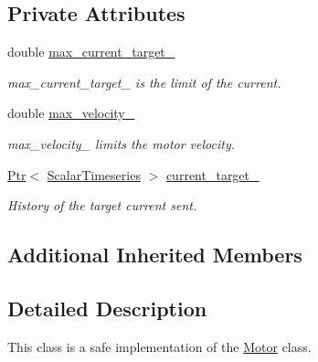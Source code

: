 \subsection*{Private Attributes}
\begin{DoxyCompactItemize}
\item 
double \hyperlink{classblmc__drivers_1_1SafeMotor_ae58230855ac502d9c702304d785eb833}{max\+\_\+current\+\_\+target\+\_\+}\hypertarget{classblmc__drivers_1_1SafeMotor_ae58230855ac502d9c702304d785eb833}{}\label{classblmc__drivers_1_1SafeMotor_ae58230855ac502d9c702304d785eb833}

\begin{DoxyCompactList}\small\item\em max\+\_\+current\+\_\+target\+\_\+ is the limit of the current. \end{DoxyCompactList}\item 
double \hyperlink{classblmc__drivers_1_1SafeMotor_a1885b2a1c298765cae0a7ccda75d5f3f}{max\+\_\+velocity\+\_\+}\hypertarget{classblmc__drivers_1_1SafeMotor_a1885b2a1c298765cae0a7ccda75d5f3f}{}\label{classblmc__drivers_1_1SafeMotor_a1885b2a1c298765cae0a7ccda75d5f3f}

\begin{DoxyCompactList}\small\item\em max\+\_\+velocity\+\_\+ limits the motor velocity. \end{DoxyCompactList}\item 
\hyperlink{classblmc__drivers_1_1MotorInterface_ae31f230b9da3674a05543023c90b124c}{Ptr}$<$ \hyperlink{classblmc__drivers_1_1MotorInterface_a49b8fc916b9f9debbd7b0988463db5cd}{Scalar\+Timeseries} $>$ \hyperlink{classblmc__drivers_1_1SafeMotor_af79e6910868177f18a498ea83b350e3f}{current\+\_\+target\+\_\+}\hypertarget{classblmc__drivers_1_1SafeMotor_af79e6910868177f18a498ea83b350e3f}{}\label{classblmc__drivers_1_1SafeMotor_af79e6910868177f18a498ea83b350e3f}

\begin{DoxyCompactList}\small\item\em History of the target current sent. \end{DoxyCompactList}\end{DoxyCompactItemize}
\subsection*{Additional Inherited Members}


\subsection{Detailed Description}
This class is a safe implementation of the \hyperlink{classblmc__drivers_1_1Motor}{Motor} class. 

